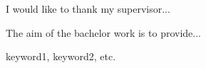 \setcounter{page}{1}

\begin{ThesisDeclaration}
  \DeclarationText
  \AdvisorName
\end{ThesisDeclaration}

\begin{ThesisThanks}
  I would like to thank my supervisor...
\end{ThesisThanks}

\begin{ThesisAbstract}
  The aim of the bachelor work is to provide...
\end{ThesisAbstract}

\begin{ThesisKeyWords}
  keyword1, keyword2, etc.
\end{ThesisKeyWords}